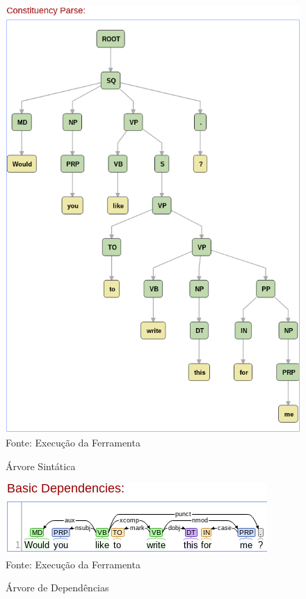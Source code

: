\begin{figure}[H]
\centering
\caption{Árvore Sintática} %
\includegraphics[scale=0.6]{04d}\\  %
{\small Fonte: Execução da Ferramenta} %
\label{fig:exemplo} %
\end{figure}

\begin{figure}[H]
\centering
\caption{Árvore de Dependências} %
\includegraphics[scale=0.9]{05e}\\  %
{\small Fonte: Execução da Ferramenta} %
\label{fig:exemplo} %
\end{figure}

